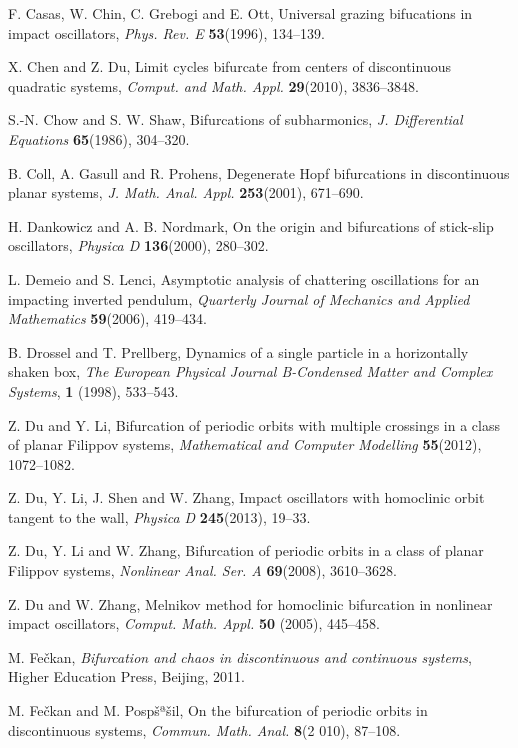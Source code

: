 \documentclass[12pt,openany,CJK,oneside]{cctbook}
\begin{document}
{{\begin{thebibliography}{999}
 F. Casas, W. Chin, C. Grebogi and E. Ott, Universal grazing bifucations in impact oscillators, {\it Phys. Rev. E} {\bf 53}(1996), 134--139.

X. Chen and Z. Du, Limit cycles bifurcate from centers of discontinuous quadratic systems, {\it Comput. and Math. Appl.} {\bf 29}(2010), 3836--3848.

 S.-N. Chow and S. W. Shaw, Bifurcations of subharmonics,
 {\it J. Differential Equations} {\bf 65}(1986), 304--320.

 B. Coll, A. Gasull and R. Prohens, Degenerate Hopf bifurcations in discontinuous planar systems, {\it J. Math. Anal. Appl.} {\bf 253}(2001), 671--690.

H. Dankowicz and A. B. Nordmark, On the origin and bifurcations of stick-slip oscillators,
{\it Physica D} {\bf 136}(2000), 280--302.

 L. Demeio and S. Lenci, Asymptotic analysis of chattering oscillations
for an impacting inverted pendulum, {\it Quarterly Journal of Mechanics and Applied Mathematics}  {\bf 59}(2006),  419--434.

 B. Drossel and T. Prellberg, Dynamics of a single particle in a horizontally shaken box, {\it The European Physical Journal B-Condensed Matter and Complex Systems}, {\bf 1} (1998), 533--543.

 Z. Du and Y. Li, Bifurcation of periodic orbits with multiple crossings in a class of planar Filippov systems, {\it Mathematical and Computer Modelling} {\bf 55}(2012), 1072--1082.

 Z. Du, Y. Li, J. Shen and W. Zhang, Impact oscillators with homoclinic orbit
tangent to the wall, {\it Physica D} {\bf 245}(2013), 19--33.

Z. Du, Y. Li and W. Zhang, Bifurcation of periodic orbits in a class of planar Filippov systems, {\it Nonlinear Anal. Ser. A} {\bf 69}(2008), 3610--3628.

 Z. Du and W. Zhang, Melnikov method for homoclinic
bifurcation in nonlinear impact oscillators,  {\it Comput. Math. Appl.} {\bf 50} (2005), 445--458.

 M. Fe\v{c}kan, {\it Bifurcation and chaos in discontinuous and continuous systems},
Higher Education Press, Beijing, 2011.

 M. Fe\v{c}kan and M. Pospšª\v{s}il, On the bifurcation of periodic orbits in discontinuous systems, {\it Commun. Math. Anal.} {\bf 8}(2 010), 87--108.


\end{thebibliography}}}
\end{document}
